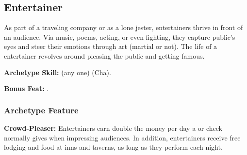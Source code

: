 \subsection{Entertainer}
As part of a traveling company or as a lone jester, entertainers thrive in front of an audience. Via music, poems, acting, or even fighting, they capture public's eyes and steer their emotions through art (martial or not). The life of a entertainer revolves around pleasing the public and getting famous.

\textbf{Archetype Skill:}  (any one) (Cha).

\textbf{Bonus Feat:} .

\subsubsection{Archetype Feature}
\textbf{Crowd-Pleaser:} Entertainers earn double the money per day a  or  check normally gives when impressing audiences. In addition, entertainers receive free lodging and food at inns and taverns, as long as they perform each night.
